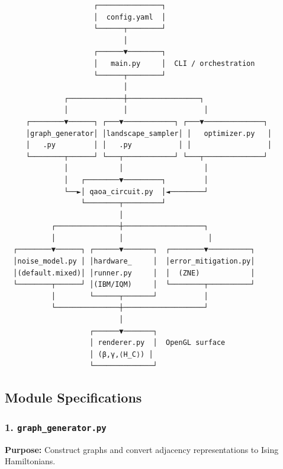 \documentclass[
  11pt,
]{report}
\begin{document}
\begin{verbatim}
                     ┌───────────────┐
                     │  config.yaml  │
                     └──────┬────────┘
                            │
                     ┌──────▼────────┐
                     │   main.py     │  CLI / orchestration
                     └──────┬────────┘
                            │
              ┌─────────────┼─────────────────┐
              │             │                  │
     ┌────────▼──────┐ ┌───▼────────────┐ ┌───▼──────────────┐
     │graph_generator│ │landscape_sampler│ │   optimizer.py   │
     │   .py         │ │   .py           │ │                  │
     └────────┬──────┘ └───┬────────────┘ └───┬──────────────┘
              │            │                   │
              │   ┌────────▼─────────┐         │
              └──►│ qaoa_circuit.py  │◄────────┘
                  └────────┬─────────┘
                           │
           ┌───────────────┼───────────────────┐
           │               │                    │
  ┌────────▼──────┐ ┌──────▼───────┐  ┌────────▼──────────┐
  │noise_model.py │ │hardware_     │  │error_mitigation.py│
  │(default.mixed)│ │runner.py     │  │  (ZNE)            │
  └────────┬──────┘ │(IBM/IQM)     │  └────────┬──────────┘
           │        └──────┬───────┘           │
           └───────────────┼───────────────────┘
                           │
                    ┌──────▼───────┐
                    │ renderer.py  │  OpenGL surface
                    │ (β,γ,⟨H_C⟩) │
                    └──────────────┘
\end{verbatim}

\subsection{Module Specifications}\label{module-specifications}

\subsubsection{\texorpdfstring{1.
\texttt{graph\_generator.py}}{1. graph\_generator.py}}\label{graph_generator.py}

\textbf{Purpose:} Construct graphs and convert adjacency representations
to Ising Hamiltonians.
\end{document}
